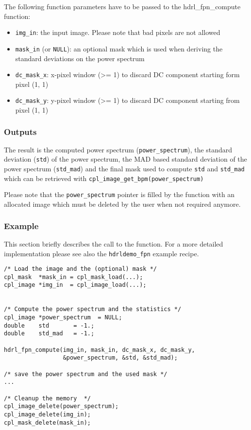 The following function parameters have to be passed to the
hdrl\_fpn\_compute function:
\begin{itemize}\itemsep-1pt \parskip0pt \small
\item \verb+img_in+: the input image. Please note that bad pixels are
  not allowed
\item \verb+mask_in+ (or \verb+NULL+): an optional mask which is used
  when deriving the standard deviations on the power spectrum
\item \verb+dc_mask_x+: x-pixel window (>= 1) to discard DC component
  starting form pixel (1, 1)
\item \verb+dc_mask_y+: y-pixel window (>= 1) to discard DC component
  starting from pixel (1, 1)
\end{itemize}

\subsubsection{Outputs}
\label{sec:algorithms:fpn:outputs}

The result is the computed power spectrum (\verb+power_spectrum+),
the standard deviation (\verb+std+) of the power spectrum, the MAD
based standard deviation of the power spectrum (\verb+std_mad+) and
the final mask used to compute \verb+std+ and \verb+std_mad+ which can
be retrieved with \verb+cpl_image_get_bpm(power_spectrum)+

Please note that the \verb+power_spectrum+ pointer is filled by the
function with an allocated image which must be deleted by the user
when not required anymore.

\subsubsection{Example}
\label{sec:algorithms:fpn:example}
This section briefly describes the call to the function. For a more
detailed implementation please see also the \verb+hdrldemo_fpn+
example recipe.

{\footnotesize
\begin{lstlisting}
/* Load the image and the (optional) mask */
cpl_mask  *mask_in = cpl_mask_load(...);
cpl_image *img_in  = cpl_image_load(...);


/* Compute the power spectrum and the statistics */
cpl_image *power_spectrum  = NULL;
double    std       = -1.;
double    std_mad   = -1.;

hdrl_fpn_compute(img_in, mask_in, dc_mask_x, dc_mask_y,
                 &power_spectrum, &std, &std_mad);

/* save the power spectrum and the used mask */
...

/* Cleanup the memory  */
cpl_image_delete(power_spectrum);
cpl_image_delete(img_in);
cpl_mask_delete(mask_in);
\end{lstlisting}
}
